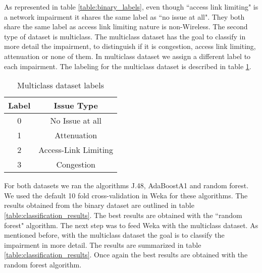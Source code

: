 As represented in table \ref{table:binary_labels}, even though ``access link limiting" is a network impairment it shares the same label as ``no issue at all". They both share the same label as access link limiting nature is non-Wireless.
The second type of dataset is multiclass. The multiclass dataset has the goal to classify in more detail the impairment, to distinguish if it is congestion, access link limiting, attenuation or none of them. In multiclass dataset we assign a different label to each impairment. The labeling for the multiclass dataset is described in table \ref{table:multiclass_labels}.

\begin{table}[!h]
	\begin{center}
		\begin{tabular}{||c c||} 
			\hline
			Label & Issue Type\\ [0.5ex] 
			\hline\hline
			0 & No Issue at all \\ 
			\hline
			1 & Attenuation\\
			\hline
			2 & Access-Link Limiting \\
			\hline
			3 & Congestion \\[1ex] 
			\hline
		\end{tabular}
		\caption{Multiclass dataset labels}
		\label{table:multiclass_labels}
	\end{center}
\end{table}

For both datasets we ran the algorithms J.48, AdaBoostA1 and random forest. We used the default 10 fold cross-validation in Weka for these algorithms. The results obtained from the binary dataset are outlined in table \ref{table:classification_results}. The best results are obtained with the ``random forest" algorithm. The next step was to feed Weka with the multiclass dataset. As mentioned before, with the multiclass dataset the goal is to classify the impairment in more detail. The results are summarized in table \ref{table:classification_results}. Once again the best results are obtained with the random forest algorithm. 
\newpage




